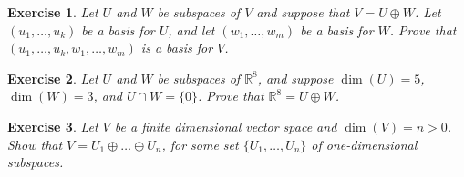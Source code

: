 \documentclass{article}
\theoremstyle{plain}
\newtheorem{Q}{Exercise}{\bfseries}{\upshape}
\newcommand{\bR}{\mathbb{R}}
\newcommand{\spa}{\mathrm{span}}
\begin{document}
\begin{Q}
Let $U$ and $W$ be subspaces of $V$ and suppose that $V = U\oplus W$. Let $(u_1,\ldots,u_k)$ be  a basis for $U$, and let $(w_1,\ldots,w_m)$ be a basis for $W$. Prove that $(u_1,\ldots,u_k,w_1,\ldots,w_m)$ is a basis for $V$.
\end{Q}
\begin{comment}
\textbf{Solution:}
We will first show that $(u_1,\ldots,u_k,w_1,\ldots,w_m)$ is linearly independent. Suppose $0 = a_1u_1+\ldots + a_ku_k + b_1w_1 + \ldots + b_mw_m$. Since $U\oplus W$ is a direct sum, by definition there is a unique $u\in U$ and $w\in W$ with $u+w=0$, and this must be $u = 0$ and $w= 0$. So $b_1w_1 + \ldots + b_mw_m = 0$ and $a_1u_1+\ldots + a_ku_k = 0$. But as $(u_1,\ldots,u_k)$ is a basis for $U$ and $(w_1,\ldots,w_m)$ is a basis for $W$, we must have $a_1=\ldots = a_k=b_1=\ldots = b_m=0$. But this means $(u_1,\ldots,u_k,w_1,\ldots,w_m)$ is linearly independent as claimed.

All we need to do now is show the list spans $V$. Let $v\in V$. Then by lemma \ref{L:LA1cap} there is $u\in U$ and $w\in W$ with $v = u+w$. So, as $(u_1,\ldots,u_k)$ and $(w_1,\ldots,w_m)$ span $U$ and $W$ respectively, we have $b_1w_1 + \ldots + b_mw_m = w$ and $a_1u_1+\ldots + a_ku_k = u$, for some choice of coefficients. But this means $v = a_1u_1+\ldots + a_ku_k+b_1w_1 + \ldots + b_mw_m$, so the list does span $v$.   
\end{comment}

\begin{Q}
Let $U$ and $W$ be subspaces of $\bR^8$, and suppose $\dim(U) = 5$, $\dim(W)= 3$, and $U\cap W =\{0\}$. Prove that $\bR^8 = U\oplus W$.
\end{Q}
\begin{comment}
\textbf{Solution:}
 Let $(u_1,\ldots,u_5)$ be  a basis for $U$, and let $(w_1,w_2,w_3)$ be a basis for $W$. By lemma \ref{L:LA1cap}, $U+W$ is a direct sum, so $(u_1,\ldots,u_5,w_1,w_2,w_3)$ is linearly independent. It also has 8 elements, which is the same as the dimension of $\bR^8$. So, by theorem \ref{T:span_ind}, $(u_1,\ldots,u_5,w_1,w_2,w_3)$ is a basis for $\bR^8$, and so $U\oplus W = \bR^8$.
\end{comment}

\begin{Q}
Let $V$ be a finite dimensional vector space and $\dim(V)= n>0$. Show that $V= U_1\oplus\ldots\oplus U_n$, for some set $\{U_1,\ldots,U_n\}$ of one-dimensional subspaces. 
\end{Q}
\begin{comment}
\textbf{Solution:}
Let $(v_1,\ldots,v_n)$ be a basis for $V$. For each $i\in \{1\ldots,n\}$, let $U_i = \spa(v_i)$. Then $V=U_1+\ldots+ U_n$, as a basis spans $V$, by definition. Also, if $0 = a_1v_n+\ldots+a_nv_n$ then $a_1=\ldots= a_n = 0$, by linear independence, so the sum is direct, by lemma \ref{L:LA1direct}.

\end{comment}
\end{document}
